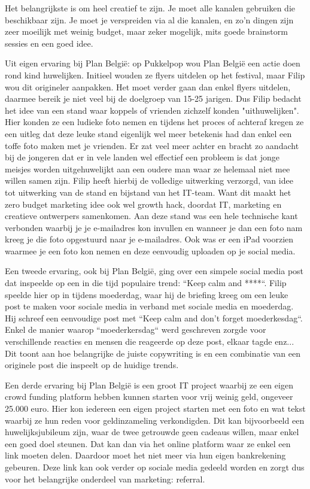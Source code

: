 \begin{itemize}
	Het belangrijkste is om heel creatief te zijn. Je moet alle kanalen gebruiken die beschikbaar zijn. Je moet je verspreiden via al die kanalen, en zo'n dingen zijn zeer moeilijk met weinig budget, maar zeker mogelijk, mits goede brainstorm sessies en een goed idee. 
	
	Uit eigen ervaring bij Plan België: op Pukkelpop wou Plan België een actie doen rond kind huwelijken. Initieel wouden ze flyers uitdelen op het festival, maar Filip wou dit origineler aanpakken. Het moet verder gaan dan enkel flyers uitdelen, daarmee bereik je niet veel bij de doelgroep van 15-25 jarigen. Dus Filip bedacht het idee van een stand waar koppels of vrienden zichzelf konden "uithuwelijken". Hier konden ze een ludieke foto nemen en tijdens het proces of achteraf kregen ze een uitleg dat deze leuke stand eigenlijk wel meer betekenis had dan enkel een toffe foto maken met je vrienden. Er zat veel meer achter en bracht zo aandacht bij de jongeren dat er in vele landen wel effectief een probleem is dat jonge meisjes worden uitgehuwelijkt aan een oudere man waar ze helemaal niet mee willen samen zijn. Filip heeft hierbij de volledige uitwerking verzorgd, van idee tot uitwerking van de stand en bijstand van het IT-team. Want dit maakt het zero budget marketing idee ook wel growth hack, doordat IT, marketing en creatieve ontwerpers samenkomen. Aan deze stand was een hele technische kant verbonden waarbij je je e-mailadres kon invullen en wanneer je dan een foto nam kreeg je die foto opgestuurd naar je e-mailadres. Ook was er een iPad voorzien waarmee je een foto kon nemen en deze eenvoudig uploaden op je social media.
	
	Een tweede ervaring, ook bij Plan België, ging over een simpele social media post dat inspeelde op een in die tijd populaire trend: ``Keep calm and ****``. Filip speelde hier op in tijdens moederdag, waar hij de briefing kreeg om een leuke post te maken voor sociale media in verband met sociale media en moederdag. Hij schreef een eenvoudige post met ``Keep calm and don't forget moederkesdag``. Enkel de manier waarop ``moederkersdag`` werd geschreven zorgde voor verschillende reacties en mensen die reageerde op deze post, elkaar tagde enz... Dit toont aan hoe belangrijke de juiste copywriting is en een combinatie van een originele post die inspeelt op de huidige trends.
	
	Een derde ervaring bij Plan België is een groot IT project waarbij ze een eigen crowd funding platform hebben kunnen starten voor vrij weinig geld, ongeveer 25.000 euro. Hier kon iedereen een eigen project starten met een foto en wat tekst waarbij ze hun reden voor geldinzameling verkondigden. Dit kan bijvoorbeeld een huwelijksjubileum zijn, waar de twee getrouwde geen cadeaus willen, maar enkel een goed doel steunen. Dat kan dan via het online platform waar ze enkel een link moeten delen. Daardoor moet het niet meer via hun eigen bankrekening gebeuren. Deze link kan ook verder op sociale media gedeeld worden en zorgt dus voor het belangrijke onderdeel van marketing: referral.
	

\end{itemize}
